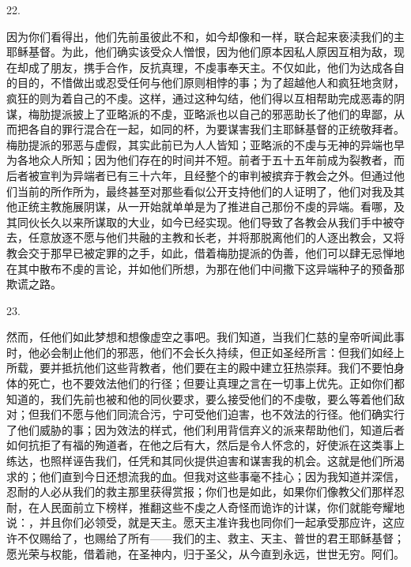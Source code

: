 22. \par

因为你们看得出，他们先前虽彼此不和，如今却像和一样，联合起来亵渎我们的主耶稣基督。为此，他们确实该受众人憎恨，因为他们原本因私人原因互相为敌，现在却成了朋友，携手合作，反抗真理，不虔事奉天主。不仅如此，他们为达成各自的目的，不惜做出或忍受任何与他们原则相悖的事；为了超越他人和疯狂地贪财，疯狂的则为着自己的不虔。这样，通过这种勾结，他们得以互相帮助完成恶毒的阴谋，梅肋提派披上了亚略派的不虔，亚略派也以自己的邪恶助长了他们的卑鄙，从而把各自的罪行混合在一起，如同的杯，为要谋害我们主耶稣基督的正统敬拜者。梅肋提派的邪恶与虚假，其实此前已为人人皆知；亚略派的不虔与无神的异端也早为各地众人所知；因为他们存在的时间并不短。前者于五十五年前成为裂教者，而后者被宣判为异端者已有三十六年，且经整个的审判被摈弃于教会之外。但通过他们当前的所作所为，最终甚至对那些看似公开支持他们的人证明了，他们对我及其他正统主教施展阴谋，从一开始就单单是为了推进自己那份不虔的异端。看哪，及其同伙长久以来所谋取的大业，如今已经实现。他们导致了各教会从我们手中被夺去，任意放逐不愿与他们共融的主教和长老，并将那脱离他们的人逐出教会，又将教会交于那早已被定罪的之手，如此，借着梅肋提派的伪善，他们可以肆无忌惮地在其中散布不虔的言论，并如他们所想，为那在他们中间撒下这异端种子的预备那欺谎之路。\par

23. \par

然而，任他们如此梦想和想像虚空之事吧。我们知道，当我们仁慈的皇帝听闻此事时，他必会制止他们的邪恶，他们不会长久持续，但正如圣经所言：但我们如经上所载，要并抵抗他们这些背教者，他们要在主的殿中建立狂热崇拜。我们不要怕身体的死亡，也不要效法他们的行径；但要让真理之言在一切事上优先。正如你们都知道的，我们先前也被和他的同伙要求，要么接受他们的不虔敬，要么等着他们敌对；但我们不愿与他们同流合污，宁可受他们迫害，也不效法的行径。他们确实行了他们威胁的事；因为效法的样式，他们利用背信弃义的派来帮助他们，知道后者如何抗拒了有福的殉道者，在他之后有大，然后是令人怀念的，好使派在这类事上练达，也照样诬告我们，任凭和其同伙提供迫害和谋害我的机会。这就是他们所渴求的；他们直到今日还想流我的血。但我对这些事毫不挂心；因为我知道并深信，忍耐的人必从我们的救主那里获得赏报；你们也是如此，如果你们像教父们那样忍耐，在人民面前立下榜样，推翻这些不虔之人奇怪而诡诈的计谋，你们就能夸耀地说：，并且你们必领受，就是天主。愿天主准许我也同你们一起承受那应许，这应许不仅赐给了，也赐给了所有——我们的主、救主、天主、普世的君王耶稣基督；愿光荣与权能，借着祂，在圣神内，归于圣父，从今直到永远，世世无穷。阿们。\par

